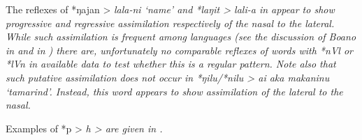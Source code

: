 The reflexes of *ŋajan > \it{lala-ni} ‘name’
and *laŋit > \it{lali-a} in  appear to show progressive
and regressive assimilation respectively of the nasal to the lateral.
While such assimilation is frequent among  languages
(see the discussion of Boano in 
and  in ) there are,
unfortunately no comparable reflexes of words with *nVl or *lVn
in available  data to test whether this is a regular pattern.
Note also that such putative assimilation does \it{not} occur
in *ŋilu/*nilu > \it{ai aka makaninu} ‘tamarind’.
Instead, this word appears to show assimilation of the lateral to the nasal.

Examples of *p > \it{h} > {\0} are given in .
\\


